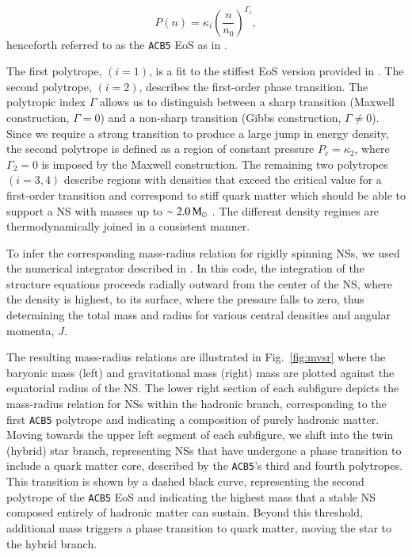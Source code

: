 \documentclass[main.tex]{subfiles}
\begin{document}
    \begin{equation}
        P(n) = \kappa_i \left( \frac{n}{n_0} \right)^{\Gamma_i},
        \label{eq:acb5_eos}
    \end{equation}
    henceforth referred to as the \texttt{ACB5} EoS as in \cite{Paschalidis:2018prd}.
    
    The first polytrope, $(i=1)$, is a fit to the stiffest EoS version provided in \cite{Hebeler:2013apj}. The second polytrope, $(i=2)$, describes the first-order phase transition. The polytropic index $\Gamma$ allows us to distinguish between a sharp transition (Maxwell construction, $\Gamma = 0$) and a non-sharp transition (Gibbs construction, $\Gamma \neq 0$). Since we require a strong transition to produce a large jump in energy density, the second polytrope is defined as a region of constant pressure $P_c = \kappa_2$, where $\Gamma_2 = 0$ is imposed by the Maxwell construction. The remaining two polytropes $(i = 3,4)$ describe regions with densities that exceed the critical value for a first-order transition and correspond to stiff quark matter which should be able to support a NS with masses up to $\sim 2.0\mathrm{\,M_\odot}$ \citep[e.g.,][]{2020NatAs...4...72C}.
    The different density regimes are thermodynamically joined in a consistent manner. 
    
    To infer the corresponding mass-radius relation for rigidly spinning NSs, we used the numerical integrator described in \cite{Alvarez-Castillo:2019apz}. 
    In this code, the integration of the structure equations proceeds radially outward from the center of the NS, where the density is highest, to its surface, where the pressure falls to zero, thus determining the total mass and radius for various central densities and angular momenta, $J$.
    
    The resulting mass-radius relations are illustrated in Fig.~\ref{fig:mvsr} where the baryonic mass (left) and gravitational mass (right) mass are plotted against the equatorial radius of the NS. 
    The lower right section of each subfigure depicts the mass-radius relation for NSs within the hadronic branch, corresponding to the first \texttt{ACB5} polytrope and indicating a composition of purely hadronic matter. Moving towards the upper left segment of each subfigure, we shift into the twin (hybrid) star branch, representing NSs that have undergone a phase transition to include a quark matter core, described by the \texttt{ACB5}'s third and fourth polytropes. This transition is shown by a dashed black curve, representing the second polytrope of the \texttt{ACB5} EoS and indicating the highest mass that a stable NS composed entirely of hadronic matter can sustain. Beyond this threshold, additional mass triggers a phase transition to quark matter, moving the star to the hybrid branch.
    
\end{document}
